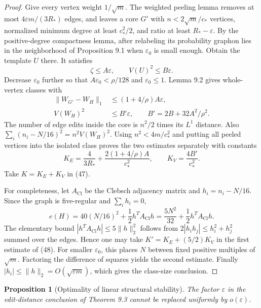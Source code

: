 \documentclass[11pt]{amsart}
\newtheorem{proposition}[theorem]{Proposition}
\theoremstyle{definition}
\theoremstyle{remark}
\begin{document}
\begin{proof}
Give every vertex weight $1/\sqrt m$. The weighted peeling lemma removes
at most $4\varepsilon m/(3R_\ast)$ edges, and leaves a core $G'$ with
$n<2\sqrt m/c_\ast$ vertices, normalized minimum degree at least
$c_\ast^2/2$, and ratio at least $R_\ast-\varepsilon$. By the positive-degree
compactness lemma, after relabeling its probability graphon lies in the
neighborhood of Proposition 9.1 when $\varepsilon_0$ is small enough.
Obtain the template $U$ there. It satisfies
\[
 \zeta\leq A\varepsilon,\qquad V(U)^2\leq B\varepsilon.
\]
Decrease $\varepsilon_0$ further so that $A\varepsilon_0<\rho/128$ and
$\varepsilon_0\leq1$. Lemma 9.2 gives whole-vertex classes with
\[
 \begin{split}
 \|W_{G'}-W_H\|_1&\leq(1+4/\rho)A\varepsilon,\\
 V(W_H)^2&\leq B'\varepsilon,\qquad B'=2B+32A^2/\rho^2.
 \end{split}
\]
The number of edge edits inside the core is $n^2/2$ times its $L^1$
distance. Also $\sum_i(n_i-N/16)^2=n^2V(W_H)^2$. Using
$n^2<4m/c_\ast^2$ and putting all peeled vertices into the isolated class
proves the two estimates separately with constants
\[
 K_E=\frac4{3R_\ast}+\frac{2(1+4/\rho)A}{c_\ast^2},\qquad
 K_V=\frac{4B'}{c_\ast^2}.
\]
Take $K=K_E+K_V$ in (47).

For completeness, let $A_{\mathrm{Cl}}$ be the Clebsch adjacency matrix
and $h_i=n_i-N/16$. Since the graph is five-regular and $\sum_i h_i=0$,
\[
 e(H)=40(N/16)^2+\frac12 h^TA_{\mathrm{Cl}}h
 =\frac{5N^2}{32}+\frac12 h^TA_{\mathrm{Cl}}h.
\]
The elementary bound $|h^TA_{\mathrm{Cl}}h|\leq5\|h\|_2^2$ follows from
$2|h_i h_j|\leq h_i^2+h_j^2$ summed over the edges. Hence one may take
$K'=K_E+(5/2)K_V$ in the first estimate of (48). For smaller
$\varepsilon_0$, this places $N$ between fixed positive multiples of
$\sqrt m$. Factoring the difference of squares yields the second estimate.
Finally $|h_i|\leq\|h\|_2=O(\sqrt{\varepsilon m})$, which gives the
class-size conclusion.
\end{proof}

\begin{proposition}[Optimality of linear structural stability]
\label{prop:linear-optimality}
The factor $\varepsilon$ in the edit-distance conclusion of Theorem 9.3
cannot be replaced uniformly by $o(\varepsilon)$.
\end{proposition}
\end{document}
